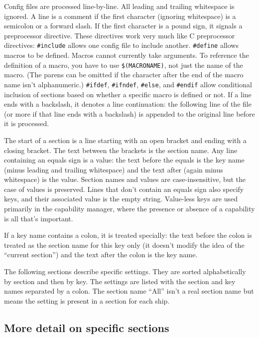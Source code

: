 \documentclass{article}
\begin{document}
Config files are processed line-by-line. All leading and trailing
whitespace is ignored. A line is a comment if the first character
(ignoring whitespace) is a semicolon or a forward slash. If the first
character is a pound sign, it signals a preprocessor directive. These
directives work very much like C preprocessor directives:
\verb/#include/ allows one config file to include another.
\verb/#define/ allows macros to be defined. Macros cannot currently take
arguments. To reference the definition of a macro, you have to use
\verb/$(MACRONAME)/, not just the name of the macro. (The parens can be
omitted if the character after the end of the macro name isn't
alphanumeric.) \verb/#ifdef/, \verb/#ifndef/, \verb/#else/, and
\verb/#endif/ allow conditional inclusion of sections based on whether a
specific macro is defined or not. If a line ends with a backslash, it
denotes a line continuation: the following line of the file (or more if
that line ends with a backslash) is appended to the original line before
it is processed.

The start of a section is a line starting with an open bracket and
ending with a closing bracket. The text between the brackets is the
section name. Any line containing an equals sign is a value: the text
before the equals is the key name (minus leading and trailing
whitespace) and the text after (again minus whitespace) is the value.
Section names and values are case-insensitive, but the case of values is
preserved. Lines that don't contain an equals sign also specify keys,
and their associated value is the empty string. Value-less keys are used
primarily in the capability manager, where the presence or absence of a
capability is all that's important.

If a key name contains a colon, it is treated specially: the text before
the colon is treated as the section name for this key only (it doesn't
modify the idea of the ``current section'') and the text after the colon
is the key name.

The following sections describe specific settings. They are sorted
alphabetically by section and then by key. The settings are listed with
the section and key names separated by a colon. The section name ``All''
isn't a real section name but means the setting is present in a section
for each ship.



\subsection{More detail on specific sections}
\end{document}
